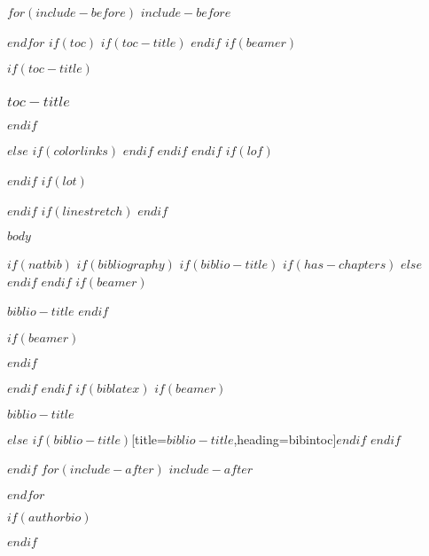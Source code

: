 \documentclass[
$if(fontsize)$
  $fontsize$,
$endif$
$if(lang)$
  $babel-lang$,
$endif$
$if(papersize)$
  $papersize$paper,
$endif$
$if(beamer)$
  ignorenonframetext,
$if(handout)$
  handout,
$endif$
$if(aspectratio)$
  aspectratio=$aspectratio$,
$endif$
$endif$
$for(classoption)$
  $classoption$$sep$,
$endfor$
]{$documentclass$}
\newif\ifbibliography
\begin{document}
\frontmatter



\clearpage




\clearpage

\pagestyle{fancy}

$for(include-before)$
$include-before$

$endfor$
$if(toc)$
$if(toc-title)$
\renewcommand*\contentsname{$toc-title$}
$endif$
$if(beamer)$
\begin{frame}[allowframebreaks]
$if(toc-title)$
  \frametitle{$toc-title$}
$endif$
  \tableofcontents[hideallsubsections]
\end{frame}
$else$
{
$if(colorlinks)$
\hypersetup{linkcolor=$if(toccolor)$$toccolor$$else$$endif$}
$endif$
\setcounter{tocdepth}{$toc-depth$}
\tableofcontents
}
$endif$
$endif$
$if(lof)$
\listoffigures
$endif$
$if(lot)$
\listoftables
$endif$
$if(linestretch)$
$endif$

\mainmatter

$body$

\backmatter

$if(natbib)$
$if(bibliography)$
$if(biblio-title)$
$if(has-chapters)$
\renewcommand\bibname{$biblio-title$}
$else$
\renewcommand\refname{$biblio-title$}
$endif$
$endif$
$if(beamer)$
\begin{frame}[allowframebreaks]{$biblio-title$}
  \bibliographytrue
$endif$
  
$if(beamer)$
\end{frame}
$endif$

$endif$
$endif$
$if(biblatex)$
$if(beamer)$
\begin{frame}[allowframebreaks]{$biblio-title$}
  \bibliographytrue
  \printbibliography[heading=none]
\end{frame}
$else$
\begingroup
\printbibliography$if(biblio-title)$[title=$biblio-title$,heading=bibintoc]$endif$
\endgroup
$endif$

$endif$
$for(include-after)$
$include-after$

$endfor$

\printindex

\clearpage{\thispagestyle{empty}\cleardoublepage}

$if(authorbio)$
\pagestyle{empty}

$endif$
\end{document}
